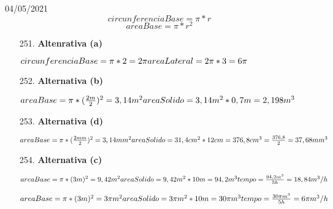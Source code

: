 \documentclass{SchoolBook}
\begin{document}
    \begin{day}{04/05/2021}
        $$ circunferenciaBase = \pi * r $$
        $$ areaBase = \pi * r^2 $$
    
        \begin{enumerate}
            \item[251.] \textbf{Altenrativa (a)}
            
            \begin{math}
                circunferenciaBase = \pi * 2 = 2\pi \\
                areaLateral = 2\pi * 3 = 6\pi
            \end{math}
            
            \item[252.] \textbf{Alternativa (b)}
            
            \begin{math}
                areaBase = \pi * (\frac{2m}{2})^2 = 3,14 m^2 \\
                areaSolido = 3,14 m^2 * 0,7 m = 2,198 m^3
            \end{math}
            
            \item[253.] \textbf{Alternativa (d)}
            
            \begin{math}
                areaBase = \pi * (\frac{2mm}{2})^2 = 3,14 mm^2 \\
                areaSolido = 31,4 cm^2 * 12cm = 376,8 cm^3 = \frac{376,8}{2} = 37,68 mm^3
            \end{math}
            
            \item[254.] \textbf{Alternativa (c)}
            
            \begin{math}
                areaBase = \pi * (3m)^2 = 9,42 m^2 \\
                areaSolido = 9,42 m^2 * 10m = 94,2 m^3 \\
                tempo = \frac{94,2 m^3}{5 h} = 18,84 m^3 / h
            \end{math}
            
            \begin{math}
                areaBase = \pi * (3m)^2 = 3\pi m^2 \\
                areaSolido = 3\pi m^2 * 10m = 30\pi m^3 \\
                tempo = \frac{30\pi m^3}{5 h} = 6 \pi m^3 / h
            \end{math}
            
        \end{enumerate}
    \end{day}
    
\end{document}
